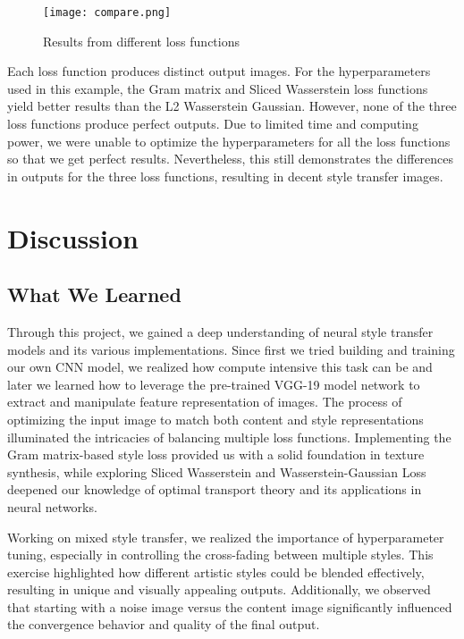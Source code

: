 \documentclass[12pt]{article}
\begin{document}
\begin{figure}[h]
    \centering
    \texttt{[image: compare.png]}
    \caption{Results from different loss functions}
    \label{fig:results}
\end{figure}

Each loss function produces distinct output images. For the hyperparameters used
in this example, the Gram matrix and Sliced Wasserstein loss functions yield
better results than the L2 Wasserstein Gaussian. However, none of the three loss
functions produce perfect outputs. Due to limited time and computing power, we
were unable to optimize the hyperparameters for all the loss functions so that
we get perfect results. Nevertheless, this still demonstrates the differences in
outputs for the three loss functions, resulting in decent style transfer images.

\section{Discussion}

\subsection{What We Learned}
Through this project, we gained a deep understanding of neural style transfer
models and its various implementations. Since first we tried building and
training our own CNN model, we realized how compute intensive this task can be
and later we learned how to leverage the pre-trained VGG-19 model network to
extract and manipulate feature representation of images. The process of
optimizing the input image to match both content and style representations
illuminated the intricacies of balancing multiple loss functions. Implementing
the Gram matrix-based style loss provided us with a solid foundation in texture
synthesis, while exploring Sliced Wasserstein and Wasserstein-Gaussian Loss
deepened our knowledge of optimal transport theory and its applications in
neural networks.

Working on mixed style transfer, we realized the importance of hyperparameter
tuning, especially in controlling the cross-fading between multiple styles. This
exercise highlighted how different artistic styles could be blended effectively,
resulting in unique and visually appealing outputs. Additionally, we observed
that starting with a noise image versus the content image significantly
influenced the convergence behavior and quality of the final output.
\end{document}
